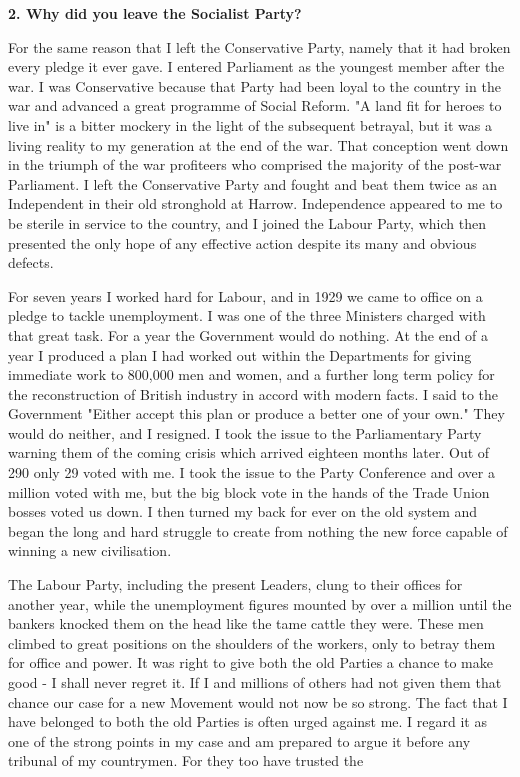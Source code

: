 \documentclass{book}
\begin{document}
\begin{flushleft}
\textbf{2. Why did you leave the Socialist Party?}

For the same reason that I left the Conservative Party, namely that it had broken every pledge it
ever gave. I entered Parliament as the youngest member after the war. I was Conservative
because that Party had been loyal to the country in the war and advanced a great programme of
Social Reform. "A land fit for heroes to live in" is a bitter mockery in the light of the subsequent
betrayal, but it was a living reality to my generation at the end of the war. That conception went
down in the triumph of the war profiteers who comprised the majority of the post-war Parliament.
I left the Conservative Party and fought and beat them twice as an Independent in their old
stronghold at Harrow. Independence appeared to me to be sterile in service to the country, and I
joined the Labour Party, which then presented the only hope of any effective action despite its
many and obvious defects.

For seven years I worked hard for Labour, and in 1929 we came to office on a pledge to tackle
unemployment. I was one of the three Ministers charged with that great task. For a year the
Government would do nothing. At the end of a year I produced a plan I had worked out within
the Departments for giving immediate work to 800,000 men and women, and a further long term
policy for the reconstruction of British industry in accord with modern facts. I said to the
Government "Either accept this plan or produce a better one of your own." They would do
neither, and I resigned. I took the issue to the Parliamentary Party warning them of the coming
crisis which arrived eighteen months later. Out of 290 only 29 voted with me. I took the issue to
the Party Conference and over a million voted with me, but the big block vote in the hands of the
Trade Union bosses voted us down. I then turned my back for ever on the old system and began
the long and hard struggle to create from nothing the new force capable of winning a new
civilisation.

The Labour Party, including the present Leaders, clung to their offices for another year, while the
unemployment figures mounted by over a million until the bankers knocked them on the head
like the tame cattle they were. These men climbed to great positions on the shoulders of the
workers, only to betray them for office and power. It was right to give both the old Parties a
chance to make good - I shall never regret it. If I and millions of others had not given them that
chance our case for a new Movement would not now be so strong. The fact that I have belonged
to both the old Parties is often urged against me. I regard it as one of the strong points in my case
and am prepared to argue it before any tribunal of my countrymen. For they too have trusted the
\end{flushleft}
\end{document}
